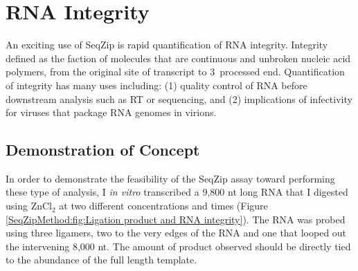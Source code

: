 \section{RNA Integrity}
  \label{SeqZipMethod:sec:RNA Integrity via SeqZip}

  An exciting use of SeqZip is rapid quantification of RNA integrity. Integrity defined as the faction of molecules that are continuous and unbroken nucleic acid polymers, from the original site of transcript to 3\textprime~processed end. Quantification of integrity has many uses including: (1) quality control of RNA before downstream analysis such as RT or sequencing, and (2) implications of infectivity for viruses that package RNA genomes in virions.

  \subsection{Demonstration of Concept}
    \label{SeqZipMethod:subsec:SeqZip can be used to examine viral genomes}

    In order to demonstrate the feasibility of the SeqZip assay toward performing these type of analysis, I \textit{in vitro} transcribed a 9,800 nt long RNA that I digested using ZnCl$_{2}$ at two different concentrations and times (Figure \ref{SeqZipMethod:fig:Ligation product and RNA integrity}). The RNA was probed using three ligamers, two to the very edges of the RNA and one that looped out the intervening 8,000 nt. The amount of product observed should be directly tied to the abundance of the full length template.


